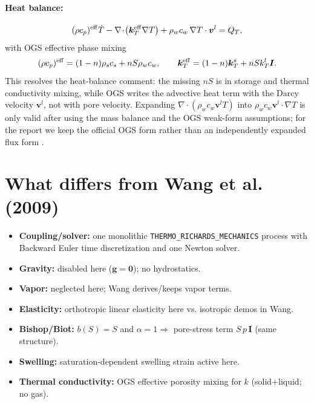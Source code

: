 \documentclass[10pt,a4paper]{article}
\newcommand{\I}{\bm{I}}
\newcommand{\grad}{\nabla}
\newcommand{\divv}{\nabla\!\cdot}
\newcommand{\TT}{T}
\newcommand{\pp}{p}
\newcommand{\rhoW}{\rho_w}
\newcommand{\npor}{n}
\newcommand{\Sat}{S}
\newcommand{\vW}{\bm v^l}
\newcommand{\keff}{k}
\begin{document}
\paragraph{Heat balance:}
\[
(\rho c_p)^{\rm eff}\dot{\TT}
-\divv\!\left(\bm{k}_T^{\rm eff}\grad\TT\right)
+\rhoW c_w\,\grad\TT\cdot\vW
=Q_T,
\]
with OGS effective phase mixing
\[
(\rho c_p)^{\rm eff}=(1-\npor)\rho_s c_s+\npor\Sat\rhoW c_w,
\qquad
\bm{k}_T^{\rm eff}=(1-\npor)\bm{k}_T^s+\npor\Sat k_T^l\I .
\]
This resolves the heat-balance comment: the missing \(\npor\Sat\) is in storage and
thermal conductivity mixing, while OGS writes the advective heat term with the Darcy
velocity \(\vW\), not with pore velocity. Expanding
\(\divv(\rhoW c_w \vW \TT)\) into \(\rhoW c_w \vW\cdot\grad\TT\) is only valid after
using the mass balance and the OGS weak-form assumptions; for the report we keep the
official OGS form rather than an independently expanded flux form
\cite[Sec.~``Governing equations without vapor diffusion'']{OpenGeoSysTRMDocs}.

\section{What differs from Wang et al. (2009)}
\begin{itemize}[leftmargin=1.2em]
  \item \textbf{Coupling/solver:} one monolithic \texttt{THERMO\_RICHARDS\_MECHANICS}
  process with Backward Euler time discretization and one Newton solver.
  \item \textbf{Gravity:} disabled here (\(\bm g=\bm 0\)); no hydrostatics.
  \item \textbf{Vapor:} neglected here; Wang derives/keeps vapor terms.
  \item \textbf{Elasticity:} orthotropic linear elasticity here vs. isotropic demos in Wang.
  \item \textbf{Bishop/Biot:} \(b(\Sat)=\Sat\) and \(\alpha=1\Rightarrow\) pore-stress term \(\Sat\,\pp\,\I\) (same structure).
  \item \textbf{Swelling:} saturation-dependent swelling strain active here.
  \item \textbf{Thermal conductivity:} OGS effective porosity mixing for \(\keff\) (solid+liquid; no gas).
\end{itemize}
\end{document}
